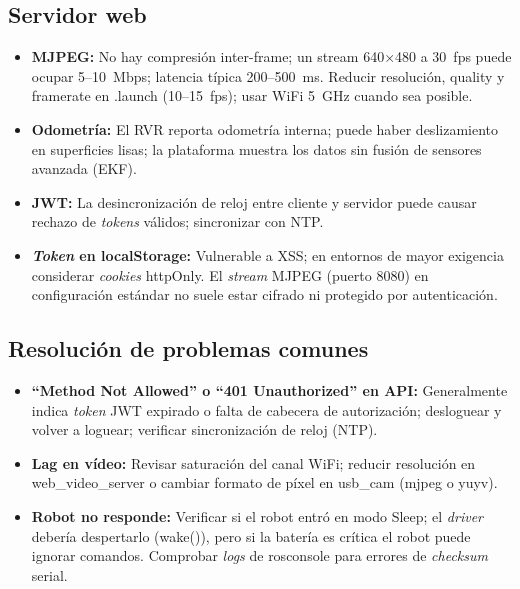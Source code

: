 \documentclass[12pt]{article}
\numberwithin{figure}{section}
\numberwithin{table}{section}
\def\code#1{#1}%
\def\file#1{#1}%
\newcommand{\code}[1]{\textcolor{codeblue}{\url{#1}}}
\newcommand{\file}[1]{\textcolor{darkblue}{\url{#1}}}
\begin{document}
\subsection{Servidor web}

\begin{itemize}
    \item \textbf{MJPEG:} No hay compresión inter-frame; un stream 640×480 a 30~fps puede ocupar 5--10~Mbps; latencia típica 200--500~ms. Reducir resolución, \code{quality} y framerate en \file{.launch} (10--15~fps); usar WiFi 5~GHz cuando sea posible.
    \item \textbf{Odometría:} El RVR reporta odometría interna; puede haber deslizamiento en superficies lisas; la plataforma muestra los datos sin fusión de sensores avanzada (EKF).
    \item \textbf{JWT:} La desincronización de reloj entre cliente y servidor puede causar rechazo de \textit{tokens} válidos; sincronizar con NTP.
    \item \textbf{\textit{Token} en localStorage:} Vulnerable a XSS; en entornos de mayor exigencia considerar \textit{cookies} \code{httpOnly}. El \textit{stream} MJPEG (puerto 8080) en configuración estándar no suele estar cifrado ni protegido por autenticación.
\end{itemize}


\subsection{Resolución de problemas comunes}

\begin{itemize}
    \item \textbf{``Method Not Allowed'' o ``401 Unauthorized'' en API:} Generalmente indica \textit{token} JWT expirado o falta de cabecera de autorización; desloguear y volver a loguear; verificar sincronización de reloj (NTP).
    \item \textbf{Lag en vídeo:} Revisar saturación del canal WiFi; reducir resolución en \code{web\_video\_server} o cambiar formato de píxel en \code{usb\_cam} (\code{mjpeg} o \code{yuyv}).
    \item \textbf{Robot no responde:} Verificar si el robot entró en modo Sleep; el \textit{driver} debería despertarlo (\code{wake()}), pero si la batería es crítica el robot puede ignorar comandos. Comprobar \textit{logs} de \code{rosconsole} para errores de \textit{checksum} serial.
\end{itemize}
\end{document}
